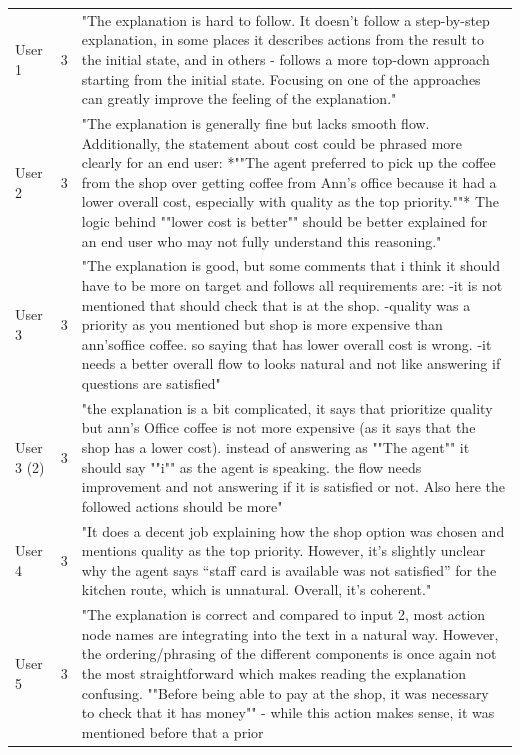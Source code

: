 \documentclass[sigconf,nonacm]{acmart}
\begin{document}
\begin{longtable}{l|l|p{15cm}}
        User 1 & 3 & "The explanation is hard to follow. It doesn't follow a step-by-step explanation, in some places it describes
actions from the result to the initial state, and in others - follows a more top-down approach starting from the
initial state. Focusing on one of the approaches can greatly improve the feeling of the explanation." \\
        User 2 & 3 & "The explanation is generally fine but lacks smooth flow. Additionally, the statement about cost could
be phrased more clearly for an end user: *""The agent preferred to pick up the coffee from the shop over getting
coffee from Ann's office because it had a lower overall cost, especially with quality as the top priority.""* The
logic behind ""lower cost is better"" should be better explained for an end user who may not fully understand this
reasoning." \\
        User 3 & 3 & "The explanation is good, but some comments that i think it should have to be more on target and follows all
requirements are:
-it is not mentioned that should check that is at the shop.
-quality was a priority as you mentioned but shop is more expensive than ann'soffice coffee. so saying that has
lower overall cost is wrong.
-it needs a better overall flow to looks natural and not like answering if questions are satisfied" \\
        User 3 (2) & 3 & "the explanation is a bit complicated, it says that prioritize quality but ann's Office coffee is not more expensive
(as it says that the shop has a lower cost).
instead of answering as ""The agent"" it should say ""i"" as the agent is speaking.
the flow needs improvement and not answering if it is satisfied or not. Also here the followed actions should be
more" \\
        User 4 & 3 & "It does a decent job explaining how the shop option was chosen and mentions quality as the top
priority. However, it’s slightly unclear why the agent says “staff card is available was not satisfied” for the
kitchen route, which is unnatural. Overall, it’s coherent." \\
        User 5 & 3 & "The explanation is correct and compared to input 2, most action node names are integrating into the text in a
natural way. However, the ordering/phrasing of the different components is once again not the most straightforward
which makes reading the explanation confusing. ""Before being able to pay at the shop, it was
necessary to check that it has money"" - while this action makes sense, it was mentioned before that a prior

\end{longtable}
\end{document}
